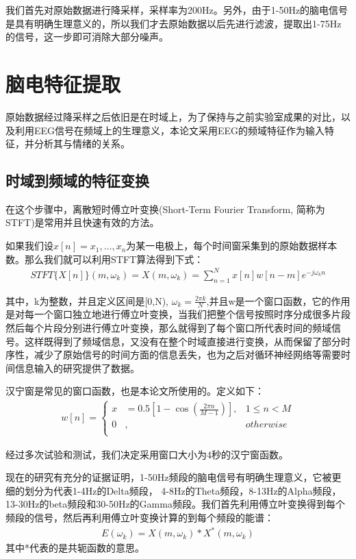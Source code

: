 	我们首先对原始数据进行降采样，采样率为200Hz。另外，由于1-50Hz的脑电信号是具有明确生理意义的，所以我们才去原始数据以后先进行滤波，提取出1-75Hz的信号，这一步即可消除大部分噪声。

\section{脑电特征提取}
	原始数据经过降采样之后依旧是在时域上，为了保持与之前实验室成果的对比，以及利用EEG信号在频域上的生理意义，本论文采用EEG的频域特征作为输入特征，并分析其与情绪的关系。
	\subsection{时域到频域的特征变换}
		在这个步骤中，离散短时傅立叶变换(Short-Term Fourier Transform, 简称为STFT)是常用并且快速有效的方法。
		
		如果我们设$x[n] = {x_1,…, x_n}$为某一电极上，每个时间窗采集到的原始数据样本数。那么我们就可以利用STFT算法得到下式：
		\begin{align}
		STFT\{X[n]\}(m, \omega_{k}) = X(m, \omega_{k}) = \sum_{n = 1}^N x[n]w[n-m]e^{-j\omega_k n}
		\end{align}
		
	其中，k为整数，并且定义区间是[0,N), $\omega_k = \frac{2\pi k}{N}$,并且w是一个窗口函数，它的作用是对每一个窗口独立地进行傅立叶变换，当我们把整个信号按照时序分成很多片段然后每个片段分别进行傅立叶变换，那么就得到了每个窗口所代表时间的频域信号。这样既得到了频域信息，又没有在整个时域直接进行变换，从而保留了部分时序性，减少了原始信号的时间方面的信息丢失，也为之后对循环神经网络等需要时间信息输入的研究提供了数据。
	
	汉宁窗是常见的窗口函数，也是本论文所使用的。定义如下：
	\begin{align}
	 w[n]=\left\{
	\begin{aligned}
	x & = 0.5[1-\cos(\frac{2\pi n}{M - 1})] ,  & 1 \leq n < M\\
	0 &, & otherwise \\
	\end{aligned}
	\right.
	\end{align}
	
	经过多次试验和测试，我们决定采用窗口大小为4秒的汉宁窗函数。
	
	现在的研究有充分的证据证明，1-50Hz频段的脑电信号有明确生理意义，它被更细的划分为代表1-4Hz的Delta频段， 4-8Hz的Theta频段，8-13Hz的Alpha频段，13-30Hz的beta频段和30-50Hz的Gamma频段。我们首先利用傅立叶变换得到每个频段的信号，然后再利用傅立叶变换计算的到每个频段的能谱：
	\begin{align}
	E(\omega_k) = X(m, \omega_k) * X^*(m, \omega_k)
	\end{align}
	其中*代表的是共轭函数的意思。
	
